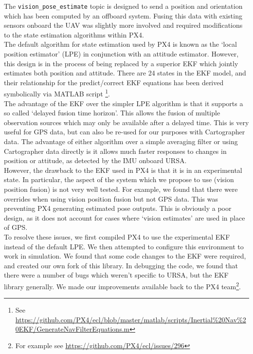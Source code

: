 \documentclass[capstone_report.tex]{subfiles}
\begin{document}
The \texttt{vision\_pose\_estimate} topic is designed to send a position and orientation which has been computed by an offboard system. Fusing this data with existing sensors onboard the UAV was slightly more involved and required modifications to the state estimation algorithms within PX4. \\

The default algorithm for state estimation used by PX4 is known as the `local position estimator' (LPE) in conjunction with an attitude estimator. However, this design is in the process of being replaced by a superior EKF which jointly estimates both position and attitude. There are 24 states in the EKF model, and their relationship for the predict/correct EKF equations has been derived symbolically via MATLAB script \footnote{See \url{https://github.com/PX4/ecl/blob/master/matlab/scripts/Inertial\%20Nav\%20EKF/GenerateNavFilterEquations.m}}.\\

The advantage of the EKF over the simpler LPE algorithm is that it supports a so called `delayed fusion time horizon'. This allows the fusion of multiple observation sources which may only be available after a delayed time. This is very useful for GPS data, but can also be re-used for our purposes with Cartographer data. The advantage of either algorithm over a simple averaging filter or using Cartographer data directly is it allows much faster responses to changes in position or attitude, as detected by the IMU onboard URSA. \\

However, the drawback to the EKF used in PX4 is that it is in an experimental state. In particular, the aspect of the system which we propose to use (vision position fusion) is not very well tested. For example, we found that there were overrides when using vision position fusion but not GPS data. This was preventing PX4 generating estimated pose outputs. This is obviously a poor design, as it does not account for cases where `vision estimates' are used in place of GPS.\\

To resolve these issues, we first compiled PX4 to use the experimental EKF instead of the default LPE. We then attempted to configure this environment to work in simulation. We found that some code changes to the EKF were required, and created our own fork of this library. In debugging the code, we found that there were a number of bugs which weren't specific to URSA, but the EKF library generally. We made our improvements available back to the PX4 team\footnote{For example see \url{https://github.com/PX4/ecl/issues/296}}. \\
\end{document}
